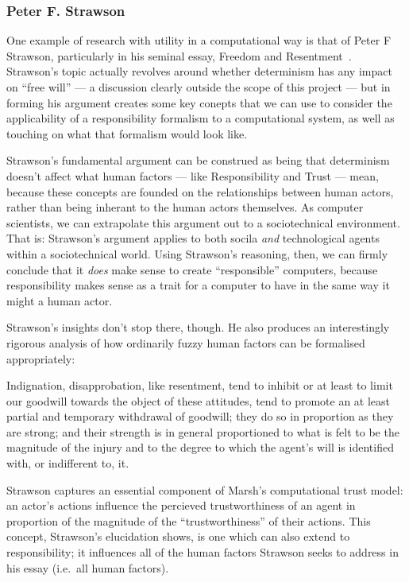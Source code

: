 \subsubsection{Peter F. Strawson}\label{sec:strawson}
One example of research with utility in a computational way is that of Peter F Strawson, particularly in his seminal essay, Freedom and Resentment~\cite{strawson}. Strawson's topic actually revolves around whether determinism has any impact on ``free will'' --- a discussion clearly outside the scope of this project --- but in forming his argument creates some key conepts that we can use to consider the applicability of a responsibility formalism to a computational system, as well as touching on what that formalism would look like.\par

Strawson's fundamental argument can be construed as being that determinism doesn't affect what human factors --- like Responsibility and Trust --- mean, because these concepts are founded on the relationships between human actors, rather than being inherant to the human actors themselves. As computer scientists, we can extrapolate this argument out to a sociotechnical environment. That is: Strawson's argument applies to both socila \emph{and} technological agents within a sociotechnical world. Using Strawson's reasoning, then, we can firmly conclude that it \emph{does} make sense to create ``responsible'' computers, because responsibility makes sense as a trait for a computer to have in the same way it might a human actor.\par

Strawson's insights don't stop there, though. He also produces an interestingly rigorous analysis of how ordinarily fuzzy human factors can be formalised appropriately:

\begin{displayquote}
    Indignation, disapprobation, like resentment, tend to inhibit or at least to limit our goodwill towards the object of these attitudes, tend to promote an at least partial and temporary withdrawal of goodwill; they do so in proportion as they are strong; and their strength is in general proportioned to what is felt to be the magnitude of the injury and to the degree to which the agent’s will is identified with, or indifferent to, it.
\end{displayquote}\cite{strawson}\par

Strawson captures an essential component of Marsh's computational trust model: an actor's actions influence the percieved trustworthiness of an agent in proportion of the magnitude of the ``trustworthiness'' of their actions. This concept, Strawson's elucidation shows, is one which can also extend to responsibility; it influences all of the human factors Strawson seeks to address in his essay (i.e.\ all human factors).\par

